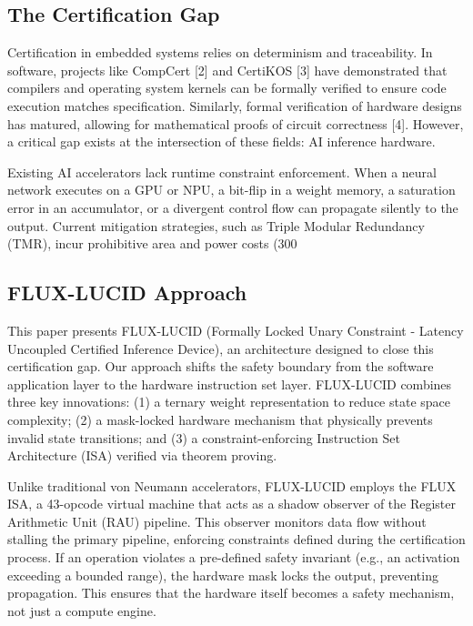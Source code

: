 \documentclass[conference]{IEEEtran}
\begin{document}
\subsection{The Certification Gap}

Certification in embedded systems relies on determinism and traceability. In software, projects like CompCert [2] and CertiKOS [3] have demonstrated that compilers and operating system kernels can be formally verified to ensure code execution matches specification. Similarly, formal verification of hardware designs has matured, allowing for mathematical proofs of circuit correctness [4]. However, a critical gap exists at the intersection of these fields: AI inference hardware.

Existing AI accelerators lack runtime constraint enforcement. When a neural network executes on a GPU or NPU, a bit-flip in a weight memory, a saturation error in an accumulator, or a divergent control flow can propagate silently to the output. Current mitigation strategies, such as Triple Modular Redundancy (TMR), incur prohibitive area and power costs (300%

\subsection{FLUX-LUCID Approach}

This paper presents FLUX-LUCID (Formally Locked Unary Constraint - Latency Uncoupled Certified Inference Device), an architecture designed to close this certification gap. Our approach shifts the safety boundary from the software application layer to the hardware instruction set layer. FLUX-LUCID combines three key innovations: (1) a ternary weight representation to reduce state space complexity; (2) a mask-locked hardware mechanism that physically prevents invalid state transitions; and (3) a constraint-enforcing Instruction Set Architecture (ISA) verified via theorem proving.

Unlike traditional von Neumann accelerators, FLUX-LUCID employs the FLUX ISA, a 43-opcode virtual machine that acts as a shadow observer of the Register Arithmetic Unit (RAU) pipeline. This observer monitors data flow without stalling the primary pipeline, enforcing constraints defined during the certification process. If an operation violates a pre-defined safety invariant (e.g., an activation exceeding a bounded range), the hardware mask locks the output, preventing propagation. This ensures that the hardware itself becomes a safety mechanism, not just a compute engine.
\end{document}
